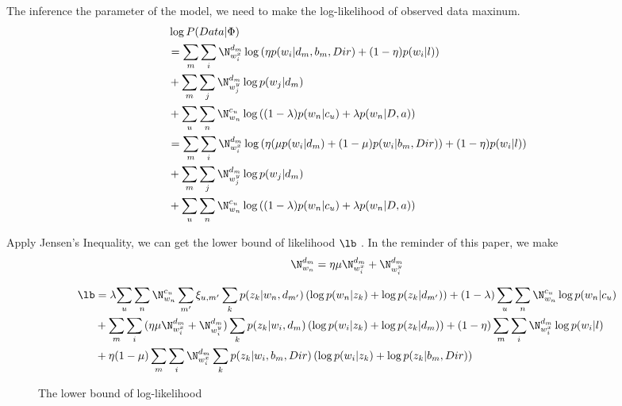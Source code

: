 The inference the parameter of the model, we need to make the log-likelihood of observed data maxinum.
\textcolor{red}{
\begin{align} 
\begin{split}
&\log{P(Data|\Phi)}\\
&=\sum _{ m }{\sum _{ i }{\N_{w_i^x}^{d_m} \log{\left( \eta p(w_i|d_m, b_m, Dir)+(1-\eta)p(w_i|l) \right)}}}\\
&+\sum _{ m }{\sum _{ j }{\N_{w_j^y}^{d_m}  \log{p(w_j|d_m)}  }}\\
&+\sum _{ u}{\sum _{ n }{\N_{w_n}^{c_u}\log{ \left((1-\lambda)p(w_n|c_u)+\lambda p(w_n|D,a)\right)}}}\\
&=\sum _{ m }{\sum _{ i }{\N_{w_i^x}^{d_m} \log{\left( \eta (\mu p(w_i|d_m) + (1-\mu) p(w_i|b_m, Dir))+(1-\eta)p(w_i|l) \right)}}}\\
&+\sum _{ m }{\sum _{ j }{\N_{w_j^y}^{d_m}  \log{p(w_j|d_m)}  }}\\
&+\sum _{ u}{\sum _{ n }{\N_{w_n}^{c_u}\log{ \left((1-\lambda)p(w_n|c_u)+\lambda p(w_n|D,a)\right)}}}\\
\end{split}	
\end{align}
}
\vspace*{2pt}

Apply Jensen's Inequality, we can get the lower bound of likelihood $\lb$ .
In the reminder of this paper, we make 
\[\N_{w_n}^{d_m}=\eta \mu \N_{w_i^x}^{d_m}+\N_{w_i^y}^{d_m}\]

\begin{figure*}[!t]
\normalsize
\setcounter{equation}{5}
\textcolor{red}{
\begin{align}
\label{low}
\begin{split}
\lb &=\lambda {\sum _{ u }\sum _{ n }\N_{w_n}^{c_u}\sum _{m'}\xi_{u,m'}\sum _{k}p(z_k|w_n,d_{m'})\left(\log{p(w_n|z_k)}+\log p(z_k|d_{m'})\right) }+ (1-\lambda) \sum _{ u }\sum _{ n }\N_{w_n}^{c_u} \log{p(w_n|c_u)}\\
&+\sum _{ m }\sum _{ i }{(\eta \mu \N_{w_i^{x}}^{d_m} + \N_{w_i^{y}}^{d_m})\sum _{k}p(z_k|w_i,d_m) \left( \log{ {p(w_i|z_k)}+\log{p(z_k|d_m)}} \right)} +(1-\eta)\sum _{ m }\sum _{ i }{\N_{w_i^x}^{d_m}\log{p(w_i|l)}}\\
&+\eta (1-\mu) \sum _{ m }\sum _{ i }{\N_{w_i^{x}}^{d_m}\sum _{k}p(z_k|w_i,b_m,Dir) \left( \log{ {p(w_i|z_k)}+\log{p(z_k|b_m,Dir)}} \right)}\\
\end{split}
\end{align}
}
\caption{The lower bound of log-likelihood}
\end{figure*}


